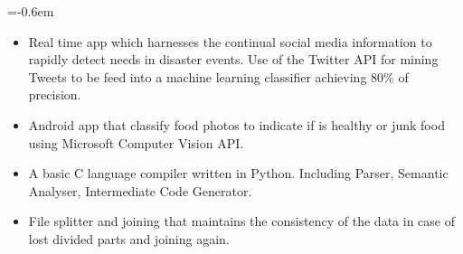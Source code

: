 \documentclass[10pt,letterpaper]{article}
\begin{document}
	\vspace{\separationAfterHeaderBeforeItem}
	\begin{itemize}
		\parskip=-0.6em 
			\begin{itemize}[label=\textbullet]
				\itemsep0em
				\item Real time app which harnesses the continual social media information to rapidly detect needs in disaster events. Use of the Twitter API for mining Tweets to be feed into a machine learning classifier achieving 80\% of precision.
			\end{itemize}
		\vspace{\separationBetweenItems}
		
		\begin{itemize}[label=\textbullet]
			\itemsep0em
			\item Android app that classify food photos to indicate if is healthy or junk food using Microsoft Computer Vision API.
		\end{itemize}
		
		\vspace{\separationBetweenItems}	
		\begin{itemize}[label=\textbullet]
			\itemsep0em
			\item A basic C language compiler written in Python. Including Parser, Semantic Analyser, Intermediate Code Generator.
		\end{itemize}
		
		\vspace{\separationBetweenItems}
		\begin{itemize}[label=\textbullet]
			\itemsep0em
			\item File splitter and joining that maintains the consistency of the data in case of lost divided parts and joining again.
		\end{itemize}
	\end{itemize}
	
\end{document}

